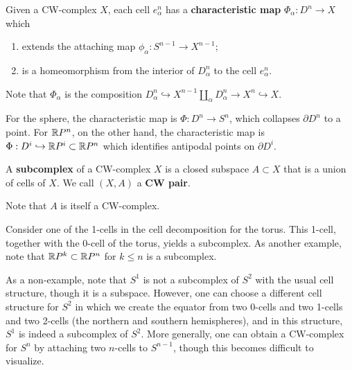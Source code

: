 \documentclass{../mathnotes}
\begin{document}
\begin{defn}
    Given a CW-complex $X$, each cell $e_\alpha^n$ has a \textbf{characteristic map} $\Phi_\alpha:D^n\to X$ which 
    \begin{enumerate}
        \item extends the attaching map $\phi_\alpha:S^{n-1}\to X^{n-1}$;
        \item is a homeomorphism from the interior of $D^n_\alpha$ to the cell $e^n_\alpha$.
    \end{enumerate}
    Note that $\Phi_\alpha$ is the composition
    $D^n_\alpha\hookrightarrow X^{n-1}\coprod_\alpha D^n_\alpha\to X^n\hookrightarrow X.$
\end{defn}

\begin{exmp}
    For the sphere, the characteristic map is $\Phi:D^n\to S^n$, which collapses $\partial D^n$ to a point.
    For $\mathbb{R} P^n$, on the other hand, the characteristic map is $\Phi:D^i\hookrightarrow \mathbb{R} P^i\subset\mathbb{R} P^n$ which
    identifies antipodal points on $\partial D^i$.
\end{exmp}

\begin{defn}
    A \textbf{subcomplex} of a CW-complex $X$ is a closed subspace $A\subset X$ that is a union of cells of $X$.
    We call $(X,A)$ a \textbf{CW pair}.
\end{defn}

\begin{rem}
    Note that $A$ is itself a CW-complex.
\end{rem}

\begin{exmp}
    Consider one of the 1-cells in the cell decomposition for the torus. This 1-cell, together with the 0-cell of the torus, yields
    a subcomplex. As another example, note that $\mathbb{R} P^k\subset\mathbb{R} P^n$ for $k\leq n$ is a subcomplex.

    As a non-example, note that $S^1$ is not a subcomplex of $S^2$ with the usual cell structure, though it is a subspace. However,
    one can choose a different cell structure for $S^2$ in which we create the equator from two 0-cells and two 1-cells and two 2-cells
    (the northern and southern hemispheres), and in this structure, $S^1$ is indeed a subcomplex of $S^2$.
More generally, one can obtain a CW-complex for $S^n$ by attaching two $n$-cells to $S^{n-1}$, though this becomes difficult to visualize.
\end{exmp}
\end{document}
